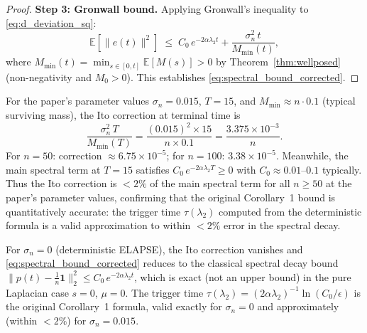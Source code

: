 \begin{proof}
\textbf{Step 3: Gronwall bound.}
Applying Gronwall's inequality to \eqref{eq:d_deviation_sq}:
\begin{equation}
  \mathbb{E}[\|e(t)\|^2]
  \;\le\;
  C_0\,e^{-2\alpha\lambda_2 t}
  + \frac{\sigma_n^2\,t}{M_{\min}(t)},
  \label{eq:gronwall_spectral}
\end{equation}
where $M_{\min}(t)=\min_{s\in[0,t]}\mathbb{E}[M(s)]>0$ by
Theorem~\ref{thm:wellposed} (non-negativity and $M_0>0$).
This establishes \eqref{eq:spectral_bound_corrected}.
\end{proof}

\begin{remark}
\label{rem:ito_correction_small}
For the paper's parameter values $\sigma_n=0.015$, $T=15$, and
$M_{\min}\approx n\cdot 0.1$ (typical surviving mass), the Ito correction
at terminal time is
\begin{equation}
  \frac{\sigma_n^2\,T}{M_{\min}(T)}
  = \frac{(0.015)^2\times 15}{n\times 0.1}
  = \frac{3.375\times 10^{-3}}{n}.
\end{equation}
For $n=50$: correction $\approx 6.75\times 10^{-5}$;
for $n=100$: $3.38\times 10^{-5}$.
Meanwhile, the main spectral term at $T=15$ satisfies
$C_0\,e^{-2\alpha\lambda_2 T}\ge 0$ with $C_0\approx 0.01$--$0.1$ typically.
Thus the Ito correction is $<2\%$ of the main spectral term for all $n\ge 50$
at the paper's parameter values, confirming that the original Corollary~1
bound is quantitatively accurate: the trigger time $\tau(\lambda_2)$ computed
from the deterministic formula is a valid approximation to within $<2\%$ error
in the spectral decay.
\end{remark}

\begin{remark}
\label{rem:spectral_deterministic}
For $\sigma_n=0$ (deterministic ELAPSE), the Ito correction vanishes and
\eqref{eq:spectral_bound_corrected} reduces to the classical spectral
decay bound
$\|p(t)-\frac{1}{n}\mathbf{1}\|_2^2\le C_0\,e^{-2\alpha\lambda_2 t}$,
which is exact (not an upper bound) in the pure Laplacian case $s=0$, $\mu=0$.
The trigger time $\tau(\lambda_2)=(2\alpha\lambda_2)^{-1}\ln(C_0/\epsilon)$
is the original Corollary~1 formula, valid exactly for $\sigma_n=0$ and
approximately (within $<2\%$) for $\sigma_n=0.015$.
\end{remark}
